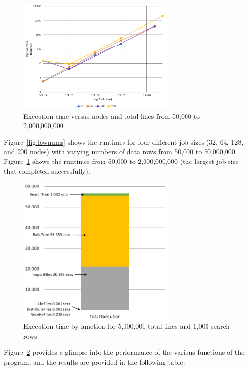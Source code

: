 \begin{figure}
\centering
\includegraphics[width=0.7\textwidth]{./images/Runtime2.png}
\caption{Execution time versus nodes and total lines from 50,000 to 2,000,000,000}
\label{fig:allnums}
\end{figure}

Figure~\ref{fig:lownums} shows the runtimes for four different job sizes (32, 64, 128, and 200 nodes) with varying numbers of data rows from 50,000 to 50,000,000. Figure~\ref{fig:allnums} shows the runtimes from 50,000 to 2,000,000,000 (the largest job size that completed successfully).


\begin{figure}
\centering
\includegraphics[width=0.7\textwidth]{./images/Runtime3.png}
\caption{Execution time by function for 5,000,000 total lines and 1,000 search rows}
\label{fig:breakdown}
\end{figure}


Figure~\ref{fig:breakdown} provides a glimpse into the performance of the various functions of the program, and the results are provided in the following table.

